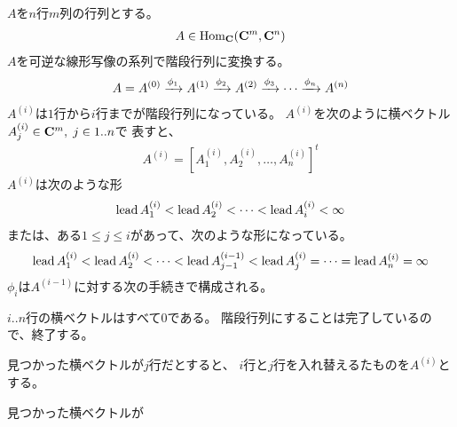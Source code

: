 	\begin{procedure}[ガウス消去法]\label{proc:ガウス消去法} %
		$A$を$n$行$m$列の行列とする。
		\begin{equation*}\begin{split} %
			A\in \Hom_\fukuso(\fukuso^m,\fukuso^n)
		\end{split}\end{equation*} %
		$A$を可逆な線形写像の系列で階段行列に変換する。
		\begin{equation*}\begin{split} %
			A=A^{(0)} \xto{\phi_1} A^{(1)} \xto{\phi_2} A^{(2)}
			\xto{\phi_3}\cdots \xto{\phi_n} A^{(n)}
		\end{split}\end{equation*} %
		$A^{(i)}$は$1$行から$i$行までが階段行列になっている。
		$A^{(i)}$を次のように横ベクトル$A_j^{(i)}\in\mathbf{C}^m,\;j\in1..n$で
		表すと、
		\begin{equation*}\begin{split} %
			A^{(i)} = [A_1^{(i)},A_2^{(i)},\dots,A_n^{(i)}]^t
		\end{split}\end{equation*} %
		$A^{(i)}$は次のような形
		\begin{equation*}\begin{split} %
			\lead A_1^{(i)} < \lead A_2^{(i)} <\cdots< \lead A_i^{(i)} < \infty
		\end{split}\end{equation*} %
		または、ある$1\le j \le i$があって、次のような形になっている。
		\begin{equation*}\begin{split} %
			\lead A_1^{(i)} < \lead A_2^{(i)} <\cdots< \lead A_{j-1}^{(i-1)} 
			< \lead A_j^{(i)} = \cdots = \lead A_n^{(i)} = \infty \\
		\end{split}\end{equation*} %
		$\phi_i$は$A^{(i-1)}$に対する次の手続きで構成される。
		\begin{description}\setlength{\itemsep}{-1mm} %
			\item[$i..n$行の中で$\lead$が有限かつ最も小さい横ベクトルを見つける]
			\item[見つからない] $i..n$行の横ベクトルはすべて$0$である。
			階段行列にすることは完了しているので、終了する。
			\item[一つだけ見つかった] 見つかった横ベクトルが$j$行だとすると、
			$i$行と$j$行を入れ替えるたものを$A^{(i)}$とする。
			\item[二つ以上見つかった] 見つかった横ベクトルが

\end{description}
\end{procedure}
